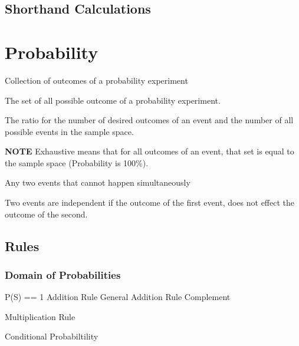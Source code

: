 \documentclass[11pt]{article}
\begin{document}


\subsection{Shorthand Calculations}


\section{Probability}

\begin{definition}[Event]\label{def:event}
    Collection of outcomes of a probability experiment
\end{definition}

\begin{definition}\label{def:sample-space}
    The set of all possible outcome of a probability experiment.
\end{definition}

\begin{definition}\label{def:Classical Probability}
    The ratio for the number of desired outcomes of an event
    and the number of all possible events in the sample space.
\end{definition}

\textbf{NOTE} Exhaustive means that for all outcomes of an event, that set is equal to the sample space (Probability is 100\%).

\begin{definition}\label{def:mutually-exclusive}
    Any two events that cannot happen simultaneously
\end{definition}

\begin{definition}\label{def:independent-events}
    Two events are independent if the outcome of the first event,
    does not effect the outcome of the second.
\end{definition}

\subsection{Rules}

\subsubsection{Domain of Probabilities}

P(S) == 1
Addition Rule
General Addition Rule
Complement

Multiplication Rule

Conditional Probabiltility
\end{document}
